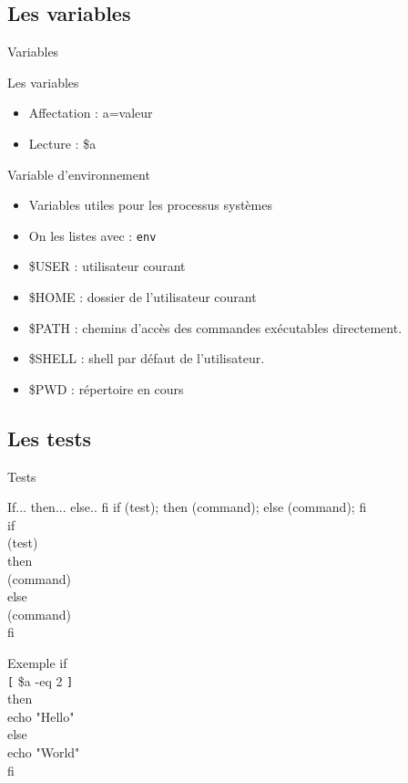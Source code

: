\subsection{Les variables}
\begin{frame}{Variables}
\begin{block}{Les variables}
\begin{itemize}
\item Affectation : a=valeur
\item Lecture : \$a
\end{itemize}
\end{block}

\begin{block}{Variable d'environnement}
\begin{itemize}
\item Variables utiles pour les processus systèmes
\item On les listes avec : \texttt{env}
\item {\$}USER : utilisateur courant
\item {\$}HOME : dossier de l'utilisateur courant
\item {\$}PATH : chemins d'accès des commandes exécutables directement.
\item {\$}SHELL : shell par défaut de l'utilisateur.
\item {\$}PWD : répertoire en cours
\end{itemize}
\end{block}
\end{frame}

\subsection{Les tests}
\begin{frame}{Tests}
\begin{block}{If... then... else.. fi}
if (test); then (command); else (command); fi\\
if\\
(test)\\
then\\
(command)\\
else\\
 (command)\\
fi
\end{block}

\begin{block}{Exemple}
if\\
 \verb![! {\$}a -eq 2 \verb!]!\\
then\\
echo "Hello"\\
else\\
 echo "World"\\
fi
\end{block}

\end{frame}

